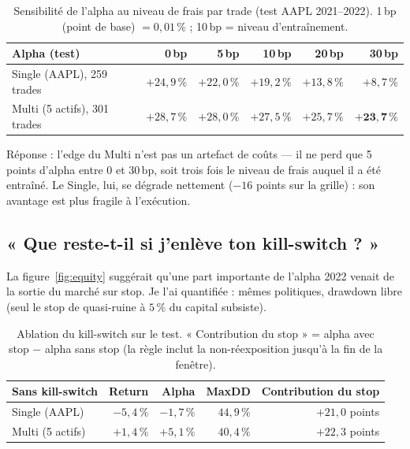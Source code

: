 \documentclass[11pt,a4paper]{article}
\newcommand{\ok}[1]{\textcolor{okgreen}{#1}}
\newcommand{\ko}[1]{\textcolor{kored}{#1}}
\begin{document}
\begin{table}[H]
\centering\small
\begin{tabular}{@{}lrrrrr@{}}
\toprule
\textbf{Alpha (test)} & \textbf{0\,bp} & \textbf{5\,bp} & \textbf{10\,bp} & \textbf{20\,bp} & \textbf{30\,bp} \\
\midrule
Single (AAPL), 259 trades & $+24{,}9\,\%$ & $+22{,}0\,\%$ & $+19{,}2\,\%$ & $+13{,}8\,\%$ & $+8{,}7\,\%$ \\
Multi (5 actifs), 301 trades & $+28{,}7\,\%$ & $+28{,}0\,\%$ & $+27{,}5\,\%$ & $+25{,}7\,\%$ & $\mathbf{+23{,}7\,\%}$ \\
\bottomrule
\end{tabular}
\caption{Sensibilité de l'alpha au niveau de frais par trade (test AAPL 2021--2022).
1\,bp (point de base) $= 0{,}01\,\%$ ; 10\,bp = niveau d'entraînement.}
\label{tab:fees}
\end{table}

Réponse : \ok{l'edge du Multi n'est pas un artefact de coûts} --- il ne perd que 5
points d'alpha entre 0 et 30\,bp, soit trois fois le niveau de frais auquel il a été
entraîné. Le Single, lui, se dégrade nettement ($-16$ points sur la grille) : son
avantage est plus fragile à l'exécution.

\subsection{« Que reste-t-il si j'enlève ton kill-switch ? »}

La figure~\ref{fig:equity} suggérait qu'une part importante de l'alpha 2022 venait de la
sortie du marché sur stop. Je l'ai quantifiée : mêmes politiques, drawdown libre (seul
le stop de quasi-ruine à $5\,\%$ du capital subsiste).

\begin{table}[H]
\centering\small
\begin{tabular}{@{}lrrrr@{}}
\toprule
\textbf{Sans kill-switch} & \textbf{Return} & \textbf{Alpha} & \textbf{MaxDD} & \textbf{Contribution du stop} \\
\midrule
Single (AAPL) & $-5{,}4\,\%$ & \ko{$-1{,}7\,\%$} & $44{,}9\,\%$ & $+21{,}0$ points \\
Multi (5 actifs) & $+1{,}4\,\%$ & \ok{$+5{,}1\,\%$} & $40{,}4\,\%$ & $+22{,}3$ points \\
\bottomrule
\end{tabular}
\caption{Ablation du kill-switch sur le test. « Contribution du stop » = alpha avec stop
$-$ alpha sans stop (la règle inclut la non-réexposition jusqu'à la fin de la fenêtre).}
\label{tab:ablation}
\end{table}
\end{document}

